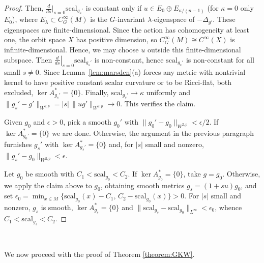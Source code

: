\documentclass[12pt,a4paper]{amsart}
\theoremstyle{plain}
\theoremstyle{definition}
\theoremstyle{remark}
\newcommand{\ga}{\mathit{g}} %
\begin{document}
\begin{proof}
Then, $\tfrac{d}{ds}|_{s=0}\mathrm{scal}_{\ga_s'}$ is constant only if $u\in E_0\oplus E_{\kappa/(n-1)}$  (for $\kappa=0$ only $E_0$), where
$E_\lambda\subset C_G^\infty(M)$ is the $G$-invariant $\lambda$-eigenspace of
$-\Delta_{\ga'}$. These eigenspaces are finite-dimensional. Since the action has cohomogeneity at least one,
the orbit space $X$ has positive dimension, so $C^\infty_G(M)\cong C^\infty(X)$ is
infinite-dimensional. Hence, we may choose $u$ outside this finite-dimensional subspace. Then $\left.\tfrac{d}{ds}\right|_{s=0}\mathrm{scal}_{\ga_s'}$ is
non-constant, hence $\mathrm{scal}_{\ga_s'}$ is non-constant for all small
$s\neq0$. Since Lemma~\ref{lem:marsden}(a) forces any metric with nontrivial kernel to have positive constant scalar curvature or to be Ricci-flat, both excluded, $\ker A_{\ga_s'}^*=\{0\}$. Finally, $\mathrm{scal}_{\ga_s'}\to\kappa$ uniformly and
$\|\ga_s'-\ga'\|_{W^{2,p}}=|s|\,\|u\ga'\|_{W^{2,p}}\to0$. This verifies the claim.


Given $\ga_0$ and $\epsilon>0$, pick a smooth $\ga_0'$ with
$\|\ga_0'-\ga_0\|_{W^{2,p}}<\epsilon/2$. If $\ker A_{\ga_0'}^*=\{0\}$ we are done.
Otherwise, the argument in the previous paragraph furnishes $\ga_s'$ with $\ker A_{\ga_s'}^*=\{0\}$ and, for
$|s|$ small and nonzero, $\|\ga_s'-\ga_0\|_{W^{2,p}}<\epsilon$.

 Let $\ga_0$ be smooth with
$C_1<\mathrm{scal}_{\ga_0}<C_2$. If $\ker A_{\ga_0}^*=\{0\}$, take $\ga=\ga_0$. Otherwise, we apply the claim above to $\ga_0$, obtaining smooth metrics $\ga_s=(1+su)\ga_0$, and set
$\epsilon_0=\min_{x\in M}\{\mathrm{scal}_{\ga_0}(x)-C_1,\,C_2-\mathrm{scal}_{\ga_0}(x)\}>0$.
For $|s|$ small and nonzero, $\ga_s$ is smooth, $\ker A_{\ga_s}^*=\{0\}$ and
$\|\mathrm{scal}_{\ga_s}-\mathrm{scal}_{\ga_0}\|_{L^\infty}<\epsilon_0$, whence
$C_1<\mathrm{scal}_{\ga_s}<C_2$. \qedhere
\end{proof}

\ 

We now proceed with the proof of Theorem \ref{theorem:GKW}.

\
\end{document}
